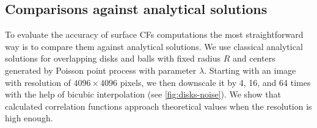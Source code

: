 \documentclass[reprint,amsmath,amssymb,aps,pre,showkeys,showpacs]{revtex4-1}
\begin{document}
\subsection{Comparisons against analytical solutions}
\label{sec:comparison}
To evaluate the accuracy of surface CFs computations the most straightforward
way is to compare them against analytical solutions. We use classical
analytical solutions for overlapping disks and balls with fixed radius $R$ and
centers generated by Poisson point process with parameter $\lambda$. Starting
with an image with resolution of $4096 \times 4096$ pixels, we then downscale it
by 4, 16, and 64 times with the help of bicubic interpolation
\cite{ledesma2018effect} (see \cref{fig:disks-noise}). We show that calculated
correlation functions approach theoretical values when the resolution is high
enough.
\begin{figure}[!pt]
  \centering
  \hfill
  \hfill
  \hfill
  \subfigure[Image size $64 \times 64$, disk radius 0.96 pixels, $C_{0.5} = 0.6549$]{
}
\end{figure}
\end{document}
